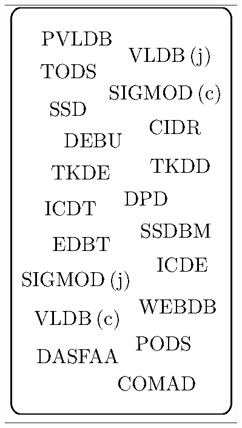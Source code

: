 \begin{table}[htbp]
\begin{tabular}{c}
\multirow{20}{*}{\includegraphics{fig/db-norm-venues-blob.eps}} \\ %
\\
\\
\\
\\
\\
\\
\\
\\
\\
\\
\\
\\
\\
\\
\\
\\
\\
\\
\\
\bottomrule
\end{tabular} \ \

\end{table}
